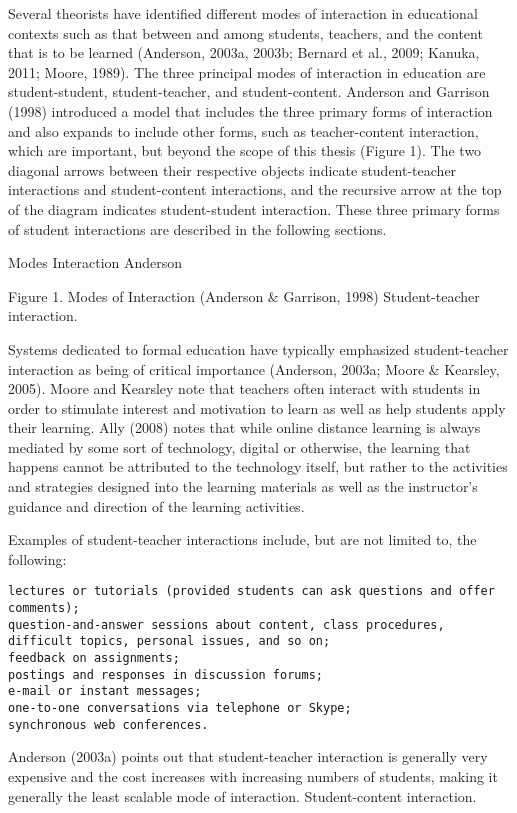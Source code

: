 \documentclass[
]{book}
\theoremstyle{definition}
\theoremstyle{definition}
\theoremstyle{definition}
\theoremstyle{definition}
\theoremstyle{remark}
\begin{document}
Several theorists have identified different modes of interaction in educational contexts such as that between and among students, teachers, and the content that is to be learned (Anderson, 2003a, 2003b; Bernard et al., 2009; Kanuka, 2011; Moore, 1989). The three principal modes of interaction in education are student-student, student-teacher, and student-content. Anderson and Garrison (1998) introduced a model that includes the three primary forms of interaction and also expands to include other forms, such as teacher-content interaction, which are important, but beyond the scope of this thesis (Figure 1). The two diagonal arrows between their respective objects indicate student-teacher interactions and student-content interactions, and the recursive arrow at the top of the diagram indicates student-student interaction. These three primary forms of student interactions are described in the following sections.

Modes Interaction Anderson

Figure 1. Modes of Interaction (Anderson \& Garrison, 1998)
Student-teacher interaction.

Systems dedicated to formal education have typically emphasized student-teacher interaction as being of critical importance (Anderson, 2003a; Moore \& Kearsley, 2005). Moore and Kearsley note that teachers often interact with students in order to stimulate interest and motivation to learn as well as help students apply their learning. Ally (2008) notes that while online distance learning is always mediated by some sort of technology, digital or otherwise, the learning that happens cannot be attributed to the technology itself, but rather to the activities and strategies designed into the learning materials as well as the instructor's guidance and direction of the learning activities.

Examples of student-teacher interactions include, but are not limited to, the following:

\begin{verbatim}
lectures or tutorials (provided students can ask questions and offer comments);
question-and-answer sessions about content, class procedures, difficult topics, personal issues, and so on;
feedback on assignments;
postings and responses in discussion forums;
e-mail or instant messages;
one-to-one conversations via telephone or Skype;
synchronous web conferences.
\end{verbatim}

Anderson (2003a) points out that student-teacher interaction is generally very expensive and the cost increases with increasing numbers of students, making it generally the least scalable mode of interaction.
Student-content interaction.
\end{document}
